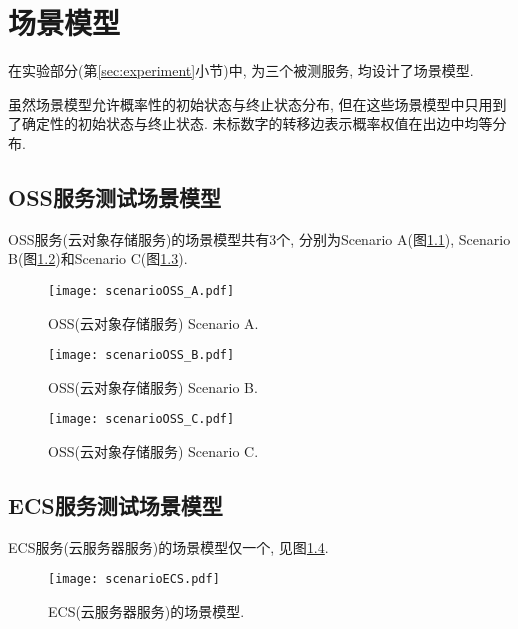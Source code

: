 \chapter{场景模型}

    在实验部分(第\ref{sec:experiment}小节)中, 为三个被测服务, 均设计了场景模型.
    
    虽然场景模型允许概率性的初始状态与终止状态分布, 但在这些场景模型中只用到了确定性的初始状态与终止状态. 未标数字的转移边表示概率权值在出边中均等分布.
    
    \section{OSS服务测试场景模型}
        OSS服务(云对象存储服务)的场景模型共有3个, 分别为Scenario A(图\ref{fig:oss_scenario_A}), Scenario B(图\ref{fig:oss_scenario_B})和Scenario C(图\ref{fig:oss_scenario_C}).
        
        \begin{figure}[!htb]
            \centering
            \texttt{[image: scenarioOSS\_A.pdf]}
            \caption{OSS(云对象存储服务) Scenario A.}
            \label{fig:oss_scenario_A}
        \end{figure}
        
         \begin{figure}[!htb]
            \centering
            \texttt{[image: scenarioOSS\_B.pdf]}
            \caption{OSS(云对象存储服务) Scenario B.}
            \label{fig:oss_scenario_B}
        \end{figure}
        
         \begin{figure}[!htb]
            \centering
            \texttt{[image: scenarioOSS\_C.pdf]}
            \caption{OSS(云对象存储服务) Scenario C.}
            \label{fig:oss_scenario_C}
        \end{figure}
    
    \section{ECS服务测试场景模型}
        ECS服务(云服务器服务)的场景模型仅一个, 见图\ref{fig:ecs_scenario}.
        
        \begin{figure}[!htb]
            \centering
            \texttt{[image: scenarioECS.pdf]}
            \caption{ECS(云服务器服务)的场景模型.}
            \label{fig:ecs_scenario}
        \end{figure}
        
